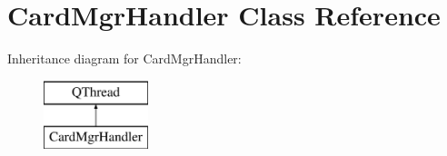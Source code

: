 \hypertarget{class_card_mgr_handler}{\section{Card\-Mgr\-Handler Class Reference}
\label{class_card_mgr_handler}
}
Inheritance diagram for Card\-Mgr\-Handler\-:\begin{figure}[H]
\begin{center}
\leavevmode
\includegraphics[height=2.000000cm]{class_card_mgr_handler}
\end{center}
\end{figure}
